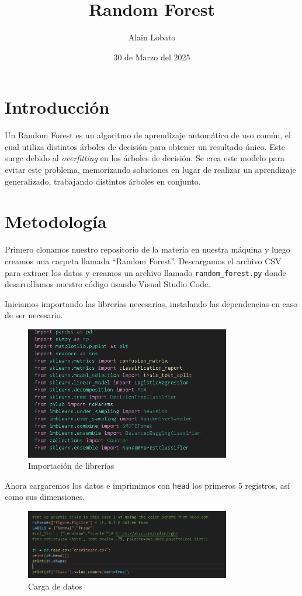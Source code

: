 \documentclass{article}
\title{Random Forest}
\author{Alain Lobato}
\date{30 de Marzo del 2025}
\begin{document}
\maketitle

\section{Introducción}
Un Random Forest es un algoritmo de aprendizaje automático de uso común, el cual utiliza distintos árboles de decisión para obtener un resultado único. Este surge debido al \textit{overfitting} en los árboles de decisión. Se crea este modelo para evitar este problema, memorizando soluciones en lugar de realizar un aprendizaje generalizado, trabajando distintos árboles en conjunto.

\section{Metodología}
Primero clonamos nuestro repositorio de la materia en nuestra máquina y luego creamos una carpeta llamada ``Random Forest''. Descargamos el archivo CSV para extraer los datos y creamos un archivo llamado \texttt{random\_forest.py} donde desarrollamos nuestro código usando Visual Studio Code.

Iniciamos importando las librerías necesarias, instalando las dependencias en caso de ser necesario.

\begin{figure}[H]
    \centering
    \includegraphics[width=0.8\textwidth]{img/1.png}
    \caption{Importación de librerías}
\end{figure}

Ahora cargaremos los datos e imprimimos con \texttt{head} los primeros 5 registros, así como sus dimensiones.

\begin{figure}[H]
    \centering
    \includegraphics[width=0.8\textwidth]{img/2.png}
    \caption{Carga de datos}
\end{figure}
\end{document}
